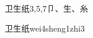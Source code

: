 \begin{entry}{卫生纸}{3,5,7}{⼙、⽣、⽷}
  \begin{phonetics}{卫生纸}{wei4sheng1zhi3}
  \end{phonetics}
\end{entry}

